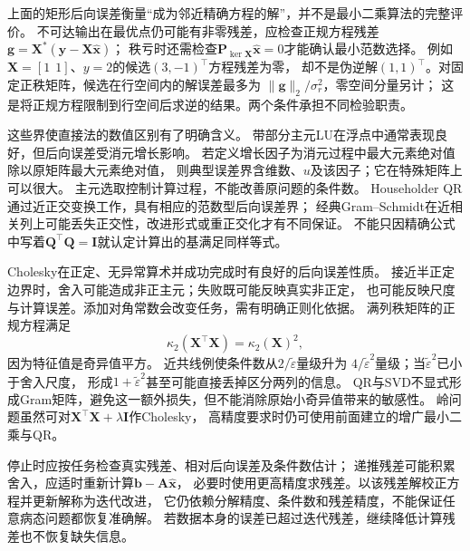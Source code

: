 上面的矩形后向误差衡量“成为邻近精确方程的解”，并不是最小二乘算法的完整评价。
不可达输出在最优点仍可能有非零残差，应检查正规方程残差
$\bm g=\bm X^*(\bm y-\bm X\widehat{\bm x})$；
秩亏时还需检查$\bm P_{\ker\bm X}\widehat{\bm x}=0$才能确认最小范数选择。
例如$\bm X=[1\ \ 1]$、$y=2$的候选$(3,-1)^\top$方程残差为零，
却不是伪逆解$(1,1)^\top$。对固定正秩矩阵，候选在行空间内的解误差最多为
$\lVert\bm g\rVert_2/\sigma_r^2$，零空间分量另计；
这是将正规方程限制到行空间后求逆的结果。两个条件承担不同检验职责。

这些界使直接法的数值区别有了明确含义。
带部分主元LU在浮点中通常表现良好，但后向误差受消元增长影响。
若定义增长因子为消元过程中最大元素绝对值除以原矩阵最大元素绝对值，
则典型误差界含维数、$u$及该因子；它在特殊矩阵上可以很大。
主元选取控制计算过程，不能改善原问题的条件数。
Householder QR通过近正交变换工作，具有相应的范数型后向误差界；
经典Gram--Schmidt在近相关列上可能丢失正交性，改进形式或重正交化才有不同保证。
不能只因精确公式中写着$\bm Q^\top\bm Q=\bm I$就认定计算出的基满足同样等式。

Cholesky在正定、无异常算术并成功完成时有良好的后向误差性质。
接近半正定边界时，舍入可能造成非正主元；失败既可能反映真实非正定，
也可能反映尺度与计算误差。添加对角常数会改变任务，需有明确正则化依据。
满列秩矩阵的正规方程满足
\begin{equation}
 \kappa_2(\bm X^\top\bm X)=\kappa_2(\bm X)^2,
 \label{eq:matrix-analysis-normal-equation-condition-square}
\end{equation}
因为特征值是奇异值平方。
近共线例使条件数从$2/\widetilde\varepsilon$量级升为
$4/\widetilde\varepsilon^2$量级；当$\widetilde\varepsilon^2$已小于舍入尺度，
形成$1+\widetilde\varepsilon^2$甚至可能直接丢掉区分两列的信息。
QR与SVD不显式形成Gram矩阵，避免这一额外损失，但不能消除原始小奇异值带来的敏感性。
岭问题虽然可对$\bm X^\top\bm X+\lambda\bm I$作Cholesky，
高精度要求时仍可使用前面建立的增广最小二乘与QR。

停止时应按任务检查真实残差、相对后向误差及条件数估计；
递推残差可能积累舍入，应适时重新计算$\bm b-\bm A\widehat{\bm x}$，
必要时使用更高精度求残差。以该残差解校正方程并更新解称为迭代改进，
它仍依赖分解精度、条件数和残差精度，不能保证任意病态问题都恢复准确解。
若数据本身的误差已超过迭代残差，继续降低计算残差也不恢复缺失信息。

